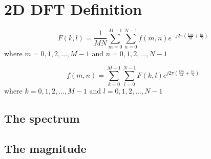 \documentclass[12pt]{article}
\begin{document}
\section{2D DFT Definition}


\begin{equation}
F(k,l)=\frac{1}{MN}\sum_{m=0}^{M-1}\sum_{n=0}^{N-1} f(m,n) e^{-j 2\pi (\frac{km}{M} + \frac{ln}{N})}
\end{equation}
where $m = 0,1,2,\dots, M-1$ and $n = 0,1,2,\dots, N-1$

\begin{equation}
f(m,n)=\sum_{k=0}^{M-1}\sum_{l=0}^{N-1} F(k,l) e^{j 2\pi (\frac{km}{M} + \frac{ln}{N})}
\end{equation}
where $k = 0,1,2,\dots, M-1$ and $l = 0,1,2,\dots, N-1$

\subsection{The spectrum}
\subsection{The magnitude}




\end{document}
